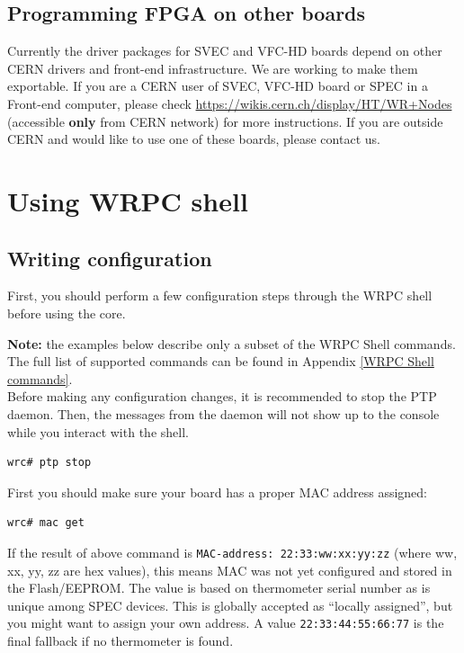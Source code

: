 \documentclass[a4paper, 12pt]{article}
\renewcommand{\_}{\underscore\allowbreak}
\begin{document}
\subsection{Programming FPGA on other boards}

Currently the driver packages for SVEC and VFC-HD boards depend on other CERN
drivers and front-end infrastructure. We are working to make them exportable. If
you are a CERN user of SVEC, VFC-HD board or SPEC in a Front-end computer,
please check
\url{https://wikis.cern.ch/display/HT/WR+Nodes} (accessible \textbf{only} from
CERN network) for more instructions. If you are outside CERN and would like to
use one of these boards, please contact us.

\newpage
\section{Using WRPC shell}

\subsection{Writing configuration}
\label{Writing configuration}

First, you should perform a few configuration steps through the WRPC shell
before using the core.

\noindent\textbf{Note:} the examples below describe only a subset of the WRPC
Shell commands. The full list of supported commands can be found in Appendix
\ref{WRPC Shell commands}.\\

Before making any configuration changes, it is recommended to stop the
PTP daemon.  Then, the messages from the daemon will not show up to the
console while you interact with the shell.

\begin{lstlisting}
wrc# ptp stop
\end{lstlisting}

\noindent First you should make sure your board has a proper MAC address
assigned:
\begin{lstlisting}
wrc# mac get
\end{lstlisting}
If the result of above command is \texttt{MAC-address: 22:33:ww:xx:yy:zz} (where
ww, xx, yy, zz are hex values), this
means MAC was not yet configured and stored in the Flash/EEPROM. The value is
based on thermometer serial number as is unique among SPEC devices. This is
globally accepted as ``locally assigned'', but you might want to assign your own
address. A value \texttt{22:33:44:55:66:77} is the final fallback if no
thermometer is found.
\end{document}
